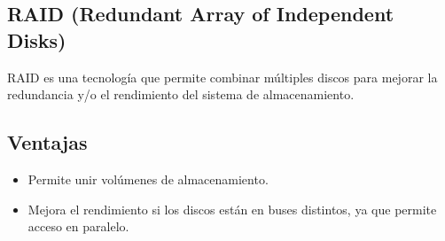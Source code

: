 \subsection{RAID (Redundant Array of Independent Disks)}

RAID es una tecnología que permite combinar múltiples discos para mejorar la redundancia y/o el rendimiento del sistema de almacenamiento.

\subsection{Ventajas}
\begin{itemize}
    \item Permite unir volúmenes de almacenamiento.
    \item Mejora el rendimiento si los discos están en buses distintos, ya que permite acceso en paralelo.
\end{itemize}

